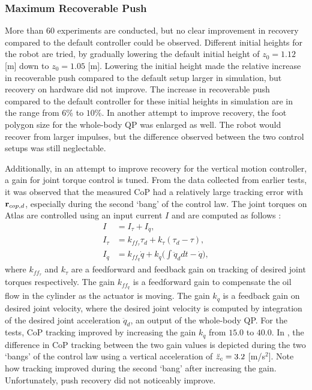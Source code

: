 \subsubsection{Maximum Recoverable Push}
More than $60$ experiments are conducted, but no clear improvement in recovery compared to the default controller could be observed. Different initial heights for the robot are tried, by gradually lowering the default initial height of $z_0=1.12$ [m] down to $z_0=1.05$ [m]. Lowering the initial height made the relative increase in recoverable push compared to the default setup larger in simulation, but recovery on hardware did not improve. The increase in recoverable push compared to the default controller for these initial heights in simulation are in the range from $6$\% to $10$\%. In another attempt to improve recovery, the foot polygon size for the whole-body \ac{QP} was enlarged as well. The robot would recover from larger impulses, but the difference observed between the two control setups was still neglectable.

Additionally, in an attempt to improve recovery for the vertical motion controller, a gain for joint torque control is tuned. From the data collected from earlier tests, it was observed that the measured \ac{CoP} had a relatively large tracking error with $\mathbf{r}_{cop,d}$, especially during the second `bang' of the control law. The joint torques on Atlas are controlled using an input current $I$ and are computed as follows \cite{koolen2016design}:
\begin{align}
	I &= I_{\tau} + I_{\dot{q}},\\
	I_{\tau} &= k_{ff_{\tau}}\tau_{d} + k_{\tau}(\tau_{d} - \tau),\\
	I_{\dot{q}} &= k_{ff_{\dot{q}}}\dot{q} + k_{\dot{q}}\bigg(\int \ddot{q}_d dt - \dot{q} \bigg),
\end{align}
where $k_{ff_{\tau}}$ and $k_{\tau}$ are a feedforward and feedback gain on tracking of desired joint torques respectively. The gain $k_{ff_{\dot{q}}}$ is a feedforward gain to compensate the oil flow in the cylinder as the actuator is moving. The gain $k_{\dot{q}}$ is a feedback gain on desired joint velocity, where the desired joint velocity is computed by integration of the desired joint acceleration $\ddot{q}_d$, an output of the whole-body \ac{QP}. For the tests, \ac{CoP} tracking improved by increasing the gain $k_{\dot{q}}$ from $15.0$ to $40.0$. In , the difference in \ac{CoP} tracking between the two gain values is depicted during the two `bangs' of the control law using a vertical acceleration of $\ddot{z}_{c}=3.2$ [m/s$^2$]. Note how tracking improved during the second `bang' after increasing the gain. Unfortunately, push recovery did not noticeably improve.

